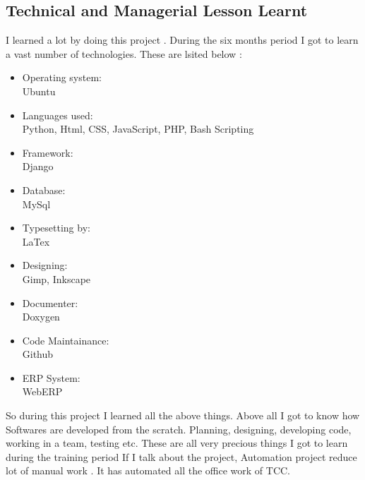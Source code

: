 \subsection{Technical and Managerial Lesson Learnt}
I learned a lot by doing this project . During the six months period I got to learn a vast number of technologies. These are lsited below :

\begin{itemize}
\item Operating system:\\
      Ubuntu
\item Languages used:\\
      Python, Html, CSS, JavaScript, PHP, Bash Scripting
\item Framework:\\
      Django 
\item Database:\\ 
      MySql
\item Typesetting by:\\ 
      LaTex
\item Designing:\\
      Gimp, Inkscape
\item Documenter:\\
      Doxygen
\item Code Maintainance:\\
      Github
\item ERP System:\\
      WebERP
\end{itemize}

So during this project I learned all the above things. Above all I got to know how Softwares are developed from the scratch. Planning, designing, developing code, working in a team, testing etc. These are all very precious things I got to learn during the training period
If I talk about the project, Automation project reduce lot of manual work . It has automated all the office work of TCC.  

\newpage
